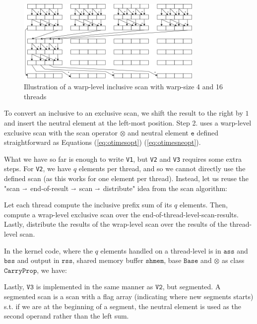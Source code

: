 \begin{figure}
  \centering
  \includegraphics[width=0.8\textwidth]{img/warp-level-scan.png}
  \caption{Illustration of a warp-level inclusive scan with warp-size 4 and 16 threads}
  \label{fig:warpscan}
\end{figure}

To convert an inclusive to an exclusive scan, we shift the result to the right
by $1$ and insert the neutral element at the left-most position. Step 2. uses a
warp-level exclusive scan with the scan operator $\otimes$ and neutral element
$\mathtt{e}$ defined straightforward as Equations (\ref{eq:otimesopt})
(\ref{eq:otimesneopt}).

What we have so far is enough to write \texttt{V1}, but \texttt{V2} and
\texttt{V3} requires some extra steps. For \texttt{V2}, we have $q$ elements per
thread, and so we cannot directly use the defined scan (as this works for one
element per thread). Instead, let us reuse the "scan $\shortrightarrow$
end-of-result $\shortrightarrow$ scan $\shortrightarrow$ distribute" idea from
the scan algorithm:

Let each thread compute the inclusive prefix sum of its $q$ elements. Then,
compute a wrap-level exclusive scan over the
end-of-thread-level-scan-results. Lastly, distribute the results of the
wrap-level scan over the results of the thread-level scan.

In the kernel code, where the $q$ elements handled on a thread-level is in
$\mathtt{ass}$ and $\mathtt{bss}$ and output in $\mathtt{rss}$, shared memory
buffer $\mathtt{shmem}$, base $\mathtt{Base}$ and $\otimes$ as class
$\mathtt{CarryProp}$, we have:



Lastly, $\mathtt{V3}$ is implemented in the same manner as $\mathtt{V2}$, but
segmented. A segmented scan is a scan with a flag array (indicating where new
segments starts) s.t. if we are at the beginning of a segment, the neutral
element is used as the second operand rather than the left sum.

